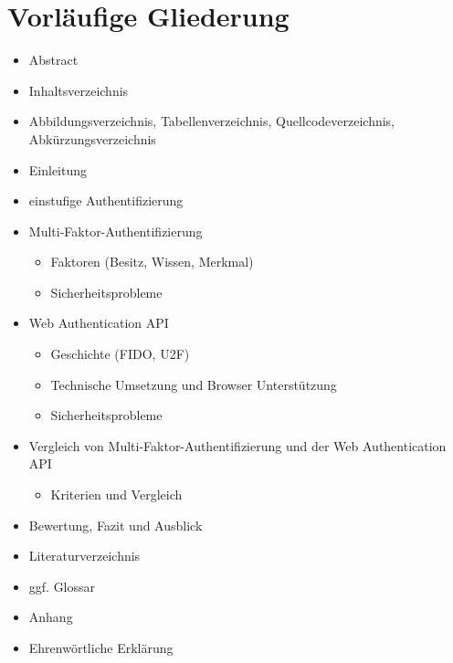 \chapter{Vorläufige Gliederung}

\begin{itemize}
	\item Abstract
	\item Inhaltsverzeichnis
	\item Abbildungsverzeichnis, Tabellenverzeichnis, Quellcodeverzeichnis, Abkürzungsverzeichnis
	\item Einleitung
	\item einstufige Authentifizierung
	\item Multi-Faktor-Authentifizierung
	\begin{itemize}
		\item Faktoren (Besitz, Wissen, Merkmal)
		\item Sicherheitsprobleme
	\end{itemize}
	\item Web Authentication API
	\begin{itemize}
		\item Geschichte (FIDO, U2F)
		\item Technische Umsetzung und Browser Unterstützung
		\item Sicherheitsprobleme
	\end{itemize}
	\item Vergleich von Multi-Faktor-Authentifizierung und der Web Authentication API
	\begin{itemize}
		\item Kriterien und Vergleich
	\end{itemize}
	\item Bewertung, Fazit und Ausblick
	\item Literaturverzeichnis
	\item ggf. Glossar
	\item Anhang
	\item Ehrenwörtliche Erklärung
\end{itemize}
